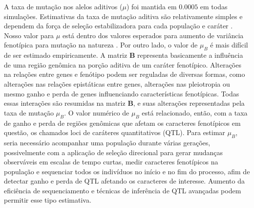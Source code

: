 A taxa de mutação nos alelos aditivos ($\mu$) foi mantida em $0.0005$ em
todas simulações.
Estimativas da taxa de mutação aditiva são relativamente
simples e dependem da força de seleção estabilizadora para cada
população e caráter \citep{Lynch1998}.
Nosso valor para $\mu$ está dentro dos valores esperados para aumento de
variância fenotípica para mutação na natureza \citep{Burger1994}.
Por outro lado, o valor de $\mu_B$ é mais difícil de ser estimado empiricamente.
A matriz $\mathbf{B}$ representa basicamente a influência de uma região
genômica na porção aditiva de um caráter fenotípico.
Alterações na relações entre genes e fenótipo podem ser reguladas de
diversas formas, como alterações nas relações epistáticas entre genes,
alterações nas pleiotropia ou mesmo ganho e perda de genes influenciando
características fenotípicas.
Todas essas interações são resumidas na matriz $\mathbf{B}$, e suas
alterações representadas pela taxa de mutação $\mu_B$.
O valor numérico de $\mu_B$ está relacionado, então, com a taxa de ganho
e perda de regiões genômicas que afetam os caracteres fenotípicos em
questão, os chamados loci de caráteres quantitativos (QTL).
Para estimar $\mu_B$, seria necessário acompanhar uma população durante
várias gerações, possivelmente com a aplicação de seleção direcional
para gerar mudanças observáveis em escalas de tempo curtas, medir
caracteres fenotípicos na população e sequenciar todos os indivíduos no
início e no fim do processo, afim de detectar ganho e perda de QTL
afetando os caracteres de interesse.
Aumento da eficiência de sequenciamento e técnicas de inferência de QTL
avançadas podem permitir esse tipo estimativa.

